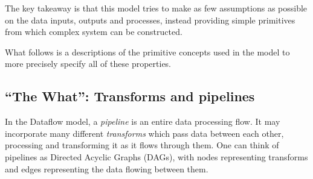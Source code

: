 The key takeaway is that this model tries to make as few assumptions as possible on the data inputs, outputs and processes, instead providing simple primitives from which complex system can be constructed.

What follows is a descriptions of the primitive concepts used in the model to more precisely specify all of these properties.

\subsection{``The What'': Transforms and pipelines}\label{sec:prep:dataflow:what}

In the Dataflow model, a \emph{pipeline} is an entire data processing flow.
It may incorporate many different \emph{transforms} which pass data between each other, processing and transforming it as it flows through them.
One can think of pipelines as Directed Acyclic Graphs (DAGs), with nodes representing transforms and edges representing the data flowing between them.

